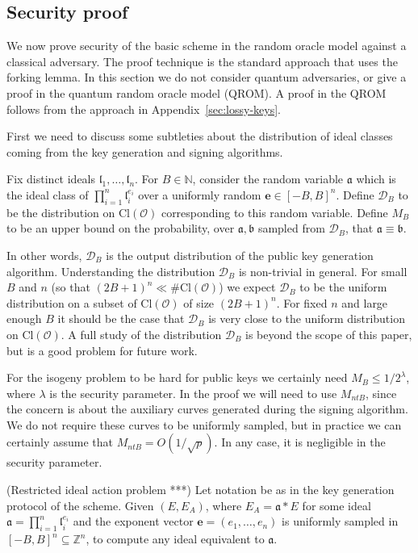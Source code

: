 \documentclass{llncs}
\newcommand{\D}{\mathcal{D}}
\newcommand{\N}{\mathbb{N}}
\newcommand{\OO}{\mathcal{O}}
\newcommand{\Z}{\mathbb{Z}}
\newcommand{\Cl}{\text{Cl}}
\renewcommand{\a}{\mathfrak{a}}
\renewcommand{\b}{\mathfrak{b}}
\renewcommand{\l}{\mathfrak{l}}
\newcommand{\e}{\textbf{e}}
\begin{document}
\subsection{Security proof}
\label{sec:security-proof}

We now prove security of the basic scheme in the random oracle model against a classical adversary. 
The proof technique is the standard approach that uses the forking lemma.
In this section we do not consider quantum adversaries, or give a proof in the quantum random oracle model (QROM).
A proof in the QROM follows from the approach in Appendix~\ref{sec:lossy-keys}.

First we need to discuss some subtleties about the distribution of ideal classes coming from the key generation and signing algorithms.

\begin{definition} \label{defn:sampling-distributions}
Fix distinct ideals $\l_1, \dots, \l_n$.
For $B \in \N$, consider the random variable $\a$ which is the ideal class of $\prod_{i=1}^n \l_i^{e_i}$ over a uniformly random $\e \in [-B,B]^n$.
Define $\D_B$ to be the distribution on $\Cl( \OO )$ corresponding to this random variable.
%
Define $M_B$ to be an upper bound on the probability, over $\a, \b$ sampled from $\D_B$, that $\a \equiv \b$.
\end{definition}

In other words, $\D_B$ is the output distribution of the public key generation algorithm.
Understanding the distribution $\D_B$ is non-trivial in general.
For small $B$ and $n$ (so that $(2B+1)^n \ll \#\Cl(\OO)$) we expect $\D_B$ to be the uniform distribution on a subset of $\Cl(\OO)$ of size $(2B+1)^n$. For fixed $n$ and large enough $B$ it should be the case that $\D_B$ is very close to the uniform distribution on $\Cl(\OO)$.
A full study of the distribution $\D_B$ is beyond the scope of this paper, but is a good problem for future work.

For the isogeny problem to be hard for public keys we certainly need $M_B \le 1/2^\lambda$, where $\lambda$ is the security parameter.
In the proof we will need to use $M_{ntB}$, since the concern is about the auxiliary curves generated during the signing algorithm. We do not require these curves to be uniformly sampled, but in practice we can certainly assume that $M_{ntB} = O( 1/\sqrt{p} )$. In any case, it is negligible in the security parameter.



\begin{definition} \label{defn:ass1p}
(Restricted ideal action problem ***)
Let notation be as in the key generation protocol of the scheme.
Given $(E, E_A)$, where $E_A = \a * E$ for some ideal $\a = \prod_{i=1}^n \l_i^{e_i}$ and the exponent vector $\e = (e_1, \dots, e_n)$ is uniformly sampled in $[-B,B]^n \subseteq \Z^n$, to compute any ideal equivalent to $\a$.
\end{definition}
\end{document}
